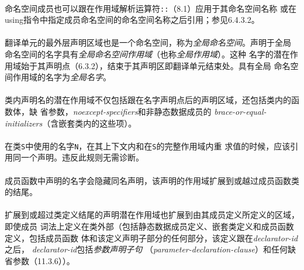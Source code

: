 \paragraph{}
命名空间成员也可以跟在作用域解析运算符\texttt{::}（8.1）应用于其命名空间名称
或在using指令中指定成员命名空间的命名空间名称之后引用；参见6.4.3.2。

\paragraph{}
翻译单元的最外层声明区域也是一个命名空间，称为\textit{全局命名空间}。声明于全局
命名空间的名字具有\textit{全局命名空间作用域}（也称\textit{全局作用域}）。这种
名字的潜在作用域始于其声明点（6.3.2），结束于其声明区即翻译单元结束处。具有全局
命名空间作用域的名字为\textit{全局名字}。

\paragraph{}
类内声明名的潜在作用域不仅包括跟在名字声明点后的声明区域，还包括类内的函数体，缺
省参数，\textit{noexcept-specifiers}和非静态数据成员的
\textit{brace-or-equal-initializers}（含嵌套类内的这些项）。

\paragraph{}
在类\texttt{S}中使用的名字\texttt{N}，在其上下文内和在\texttt{S}的完整作用域内重
求值的时候，应该引用同一个声明。违反此规则无需诊断。

\paragraph{}
成员函数中声明的名字会隐藏同名声明，该声明的作用域扩展到或越过成员函数类的结尾。

\paragraph{}
扩展到或超过类定义结尾的声明潜在作用域也扩展到由其成员定义所定义的区域，即使成员
词法上定义在类外部（包括静态数据成员定义、嵌套类定义和成员函数定义，包括成员函数
体和该定义声明子部分的任何部分，该定义跟在\textit{declarator-id}之后，
\textit{declarator-id}包括\textit{参数声明子句}
（\textit{parameter-declaration-clause}）和任何缺省参数（11.3.6））。


